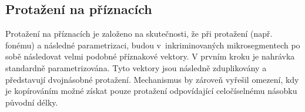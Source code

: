 \subsection{Protažení na příznacích}
\label{chap:realisation:augmentation:features}

Protažení na příznacích je založeno na skutečnosti, že při protažení (např. fonému) a následné parametrizaci, budou v~inkriminovaných mikrosegmentech po sobě následovat velmi podobné příznakové vektory.
V prvním kroku je nahrávka standardně parametrizována.
Tyto vektory jsou následně zduplikovány a představují dvojnásobné protažení.
Mechanismus by zároveň vyřešil omezení, kdy je kopírováním možné získat pouze protažení odpovídající celočíselnému násobku původní délky.


